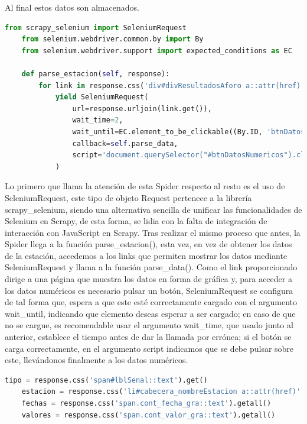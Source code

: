 Al final estos datos son almacenados.

\begin{lstlisting}[language=Python, caption={Función parse\_estacion() Agua en Navarra Data Spider}]
	from scrapy_selenium import SeleniumRequest
	from selenium.webdriver.common.by import By
	from selenium.webdriver.support import expected_conditions as EC
	
	def parse_estacion(self, response):
		for link in response.css('div#divResultadosAforo a::attr(href)'):
			yield SeleniumRequest(
				url=response.urljoin(link.get()),
				wait_time=2,
				wait_until=EC.element_to_be_clickable((By.ID, 'btnDatosNumericos')),
				callback=self.parse_data,
				script='document.querySelector("#btnDatosNumericos").click()',
			)
\end{lstlisting}

Lo primero que llama la atención de esta Spider respecto al resto es el uso de SeleniumRequest, este tipo de objeto Request pertenece a la librería scrapy\_selenium, siendo una alternativa sencilla de unificar las funcionalidades de Selenium en Scrapy, de esta forma, se lidia con la falta de integración de interacción con JavaScript en Scrapy.\newline
\newline
Tras realizar el mismo proceso que antes, la Spider llega a la función parse\_estacion(), esta vez, en vez de obtener los datos de la estación, accedemos a los links que permiten mostrar los datos mediante SeleniumRequest y llama a la función parse\_data().\newline
\newline
Como el link proporcionado dirige a una página que muestra los datos en forma de gráfica y, para acceder a los datos numéricos es necesario pulsar un botón, SeleniumRequest se configura de tal forma que, espera a que este esté correctamente cargado con el argumento wait\_until, indicando que elemento deseas esperar a ser cargado; en caso de que no se cargue, es recomendable usar el argumento wait\_time, que usado junto al anterior, establece el tiempo antes de dar la llamada por errónea; si el botón se carga correctamente, en el argumento script indicamos que se debe pulsar sobre este, llevándonos finalmente a los datos numéricos.\newline
\newline

\begin{lstlisting}[language=Python, caption={Selector en parse\_data() de Agua en Navarra Data Spider}]
	tipo = response.css('span#lblSenal::text').get()
	estacion = response.css('li#cabecera_nombreEstacion a::attr(href)').get()
	fechas = response.css('span.cont_fecha_gra::text').getall()
	valores = response.css('span.cont_valor_gra::text').getall()
\end{lstlisting}

